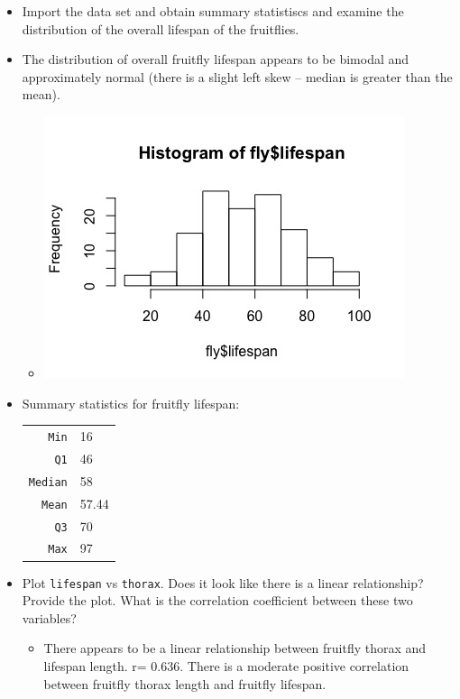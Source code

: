 \documentclass[12pt,letterpaper]{article}
\begin{document}
\begin{itemize} 
		\item Import the data set and obtain summary statistiscs and examine the distribution of the overall lifespan of the fruitflies.
	\item
	The distribution of overall fruitfly lifespan appears to be bimodal and approximately normal (there is a slight left skew -- median is greater than the mean).
	\begin{itemize}
		\item 
		\includegraphics{Histogramlifespan.jpeg}
	\end{itemize}
	\item Summary statistics for fruitfly lifespan:
	\begin{tabular}{r|l}
		\texttt{Min} & 16\\
		\texttt{Q1} & 46 \\
		\texttt{Median} & 58 \\
		\texttt{Mean} & 57.44 \\
		\texttt{Q3} & 70 \\
		\texttt{Max} & 97 \\
\end{tabular}

	\item
	Plot \texttt{lifespan} vs \texttt{thorax}. Does it look like there is a linear relationship? Provide the plot. What is the correlation coefficient between these two variables?
		\vspace{0.5cm}
\begin{itemize}
	\item
	There appears to be a linear relationship between fruitfly thorax and lifespan length. r= 0.636. There is a moderate positive correlation between fruitfly thorax length and fruitfly lifespan.

\end{itemize}
\end{itemize}
\end{document}
